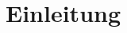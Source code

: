 \documentclass[paper=a4, fontsize=12pt, bibliography=totoc, twoside=false]{scrreprt}
\begin{document}
\tableofcontents

\chapter{Einleitung}
\end{document}
